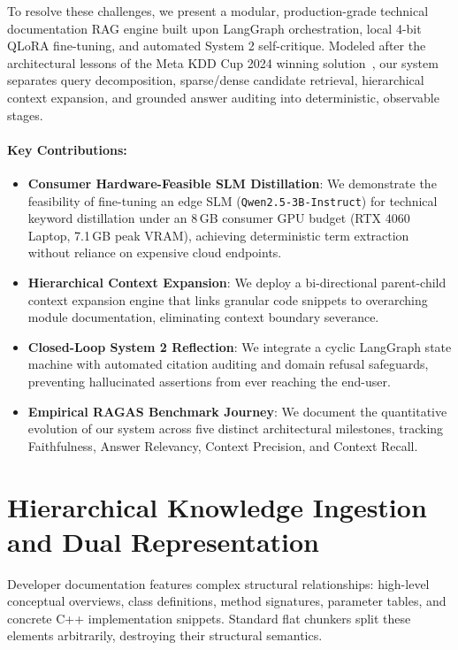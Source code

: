 \documentclass[sigconf,nonacm]{acmart}
\begin{document}
To resolve these challenges, we present a modular, production-grade technical documentation RAG engine built upon LangGraph orchestration, local 4-bit QLoRA fine-tuning, and automated System 2 self-critique. Modeled after the architectural lessons of the Meta KDD Cup 2024 winning solution~\cite{kdd_winning}, our system separates query decomposition, sparse/dense candidate retrieval, hierarchical context expansion, and grounded answer auditing into deterministic, observable stages.

\paragraph{Key Contributions:}
\begin{itemize}
    \item \textbf{Consumer Hardware-Feasible SLM Distillation}: We demonstrate the feasibility of fine-tuning an edge SLM (\texttt{Qwen2.5-3B-Instruct}) for technical keyword distillation under an 8\,GB consumer GPU budget (RTX 4060 Laptop, 7.1\,GB peak VRAM), achieving deterministic term extraction without reliance on expensive cloud endpoints.
    \item \textbf{Hierarchical Context Expansion}: We deploy a bi-directional parent-child context expansion engine that links granular code snippets to overarching module documentation, eliminating context boundary severance.
    \item \textbf{Closed-Loop System 2 Reflection}: We integrate a cyclic LangGraph state machine with automated citation auditing and domain refusal safeguards, preventing hallucinated assertions from ever reaching the end-user.
    \item \textbf{Empirical RAGAS Benchmark Journey}: We document the quantitative evolution of our system across five distinct architectural milestones, tracking Faithfulness, Answer Relevancy, Context Precision, and Context Recall.
\end{itemize}

\section{Hierarchical Knowledge Ingestion and Dual Representation}
Developer documentation features complex structural relationships: high-level conceptual overviews, class definitions, method signatures, parameter tables, and concrete C++ implementation snippets. Standard flat chunkers split these elements arbitrarily, destroying their structural semantics.
\end{document}
